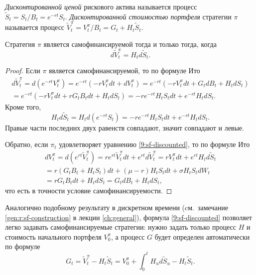 \begin{definition}
\emph{Дисконтированной ценой} рискового актива называется процесс 
$\tilde S_t = {S_t}/{B_t} = e^{-rt} S_t$. 
\emph{Дисконтированной стоимостью портфеля} стратегии $\pi$ называется процесс
$\tilde V_t^\pi = {V_t^\pi}/{B_t} = G_t + H_t \tilde S_t$.
\end{definition}

\begin{proposition}
Стратегия $\pi$ является самофинансируемой тогда и только тогда, когда
\begin{equation}
\label{9:sf-discounted}
d \tilde V_t^\pi = H_t d \tilde S_t.
\end{equation}
\end{proposition}

\begin{proof}
Если $\pi$ является самофинансируемой, то по формуле Ито
\begin{multline*}
d \tilde V_t^\pi = d(e^{-rt} V_t^\pi) = e^{-rt}(-r V_t^\pi dt + dV_t^\pi) 
= e^{-rt} (-rV_t^\pi dt + G_tdB_t + H_t d S_t) \\
= e^{-rt} (-rV_t^\pi dt +r  G_t B_tdt + H_t d S_t)
= -re^{-rt} H_tS_t dt + e^{-rt} H_t dS_t.
\end{multline*}
Кроме того,
\[
H_t d\tilde S_t = H_td(e^{-rt}S_t) = -re^{-rt}H_tS_t dt + e^{-rt}H_t dS_t.
\]
Правые части последних двух равенств совпадают, значит совпадают и левые.

Обратно, если $\pi_t$ удовлетворяет уравнению \eqref{9:sf-discounted}, то по формуле Ито
\begin{multline*}
d V_t^\pi = d (e^{rt} \tilde V_t^\pi) 
= re^{rt}\tilde V_t^\pi dt + e^{rt}d\tilde V_t^\pi 
= r V_t^\pi dt + e^{rt}H_td\tilde S_t \\
= r(G_tB_t + H_tS_t)dt+ (\mu - r)H_tS_t dt + \sigma H_tS_tdW_t \\
= r G_t B_t dt + H_t dS_t = G_t dB_t + H_tdS_t,
\end{multline*}
что есть в точности условие самофинансируемости.
\end{proof}

\begin{remark}
Аналогично подобному результату в дискретном времени (cм.\ замечание \ref{gen:r:sf-construction} в лекции \ref{ch:general}), формула \eqref{9:sf-discounted} позволяет легко задавать самофинансируемые стратегии: нужно задать только процесс $H$ и стоимость начального портфеля $V_0^\pi$, а процесс $G$ будет определен автоматически по формуле
\[
G_t = \tilde V_t^\pi - H_t \tilde S_t = V_0^\pi + \int_0^t H_u d \tilde S_u - H_t\tilde S_t.
\]  
\end{remark}


